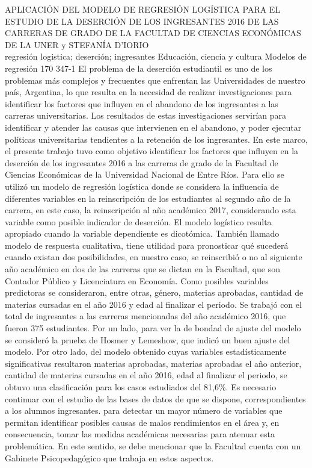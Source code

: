\A
{APLICACIÓN DEL MODELO DE REGRESIÓN LOGÍSTICA PARA EL ESTUDIO DE LA DESERCIÓN DE LOS INGRESANTES 2016 DE LAS CARRERAS DE GRADO DE LA FACULTAD DE CIENCIAS ECONÓMICAS DE LA UNER}
{ y STEFANÍA D'IORIO}
{
\\}
{regresión logistica; deserción; ingresantes} 
 {Educación, ciencia y cultura} 
 {Modelos de regresión} 
 {170} 
 {347-1}
{El problema de la deserción estudiantil es uno de los problemas más complejos y frecuentes que enfrentan las Universidades de nuestro país, Argentina, lo que resulta en la necesidad de realizar investigaciones para identificar los factores que influyen en el abandono de los ingresantes a las carreras universitarias. Los resultados de estas investigaciones servirían para identificar y atender las causas que intervienen en el abandono, y poder ejecutar políticas universitarias tendientes a la retención de los ingresantes. En este marco, el presente trabajo tuvo como objetivo identificar los factores que influyen en la deserción de los ingresantes 2016 a las carreras de grado de la Facultad de Ciencias Económicas de la Universidad Nacional de Entre Ríos. Para ello se utilizó un modelo de regresión logística donde se considera la influencia de diferentes variables en la reinscripción de los estudiantes al segundo año de la carrera, en este caso, la reinscripción al año académico 2017, considerando esta variable como posible indicador de deserción. El modelo logístico resulta apropiado cuando la variable dependiente es dicotómica. También llamado modelo de respuesta cualitativa, tiene utilidad para pronosticar qué sucederá cuando existan dos posibilidades, en nuestro caso, se reinscribió o no al siguiente año académico en dos de las carreras que se dictan en la Facultad, que son Contador Público y Licenciatura en Economía. Como posibles variables predictoras se consideraron, entre otras, género, materias aprobadas, cantidad de materias cursadas en el año 2016 y edad al finalizar el periodo. Se trabajó con el total de ingresantes a las carreras mencionadas del año académico 2016, que fueron 375 estudiantes. Por un lado, para ver la de bondad de ajuste del modelo se consideró la prueba de Hosmer y Lemeshow, que indicó un buen ajuste del modelo. Por otro lado, del modelo obtenido cuyas variables estadísticamente significativas resultaron materias aprobadas, materias aprobadas el año anterior, cantidad de materias cursadas en el año 2016, edad al finalizar el periodo, se obtuvo una clasificación para los casos estudiados del 81,6\%. Es necesario continuar con el estudio de las bases de datos de que se dispone, correspondientes a los alumnos ingresantes. para detectar un mayor número de variables que permitan identificar posibles causas de malos rendimientos en el área y, en consecuencia, tomar las medidas académicas necesarias para atenuar esta problemática. En este sentido, se debe mencionar que la Facultad cuenta con un Gabinete Psicopedagógico que trabaja en estos aspectos. }
